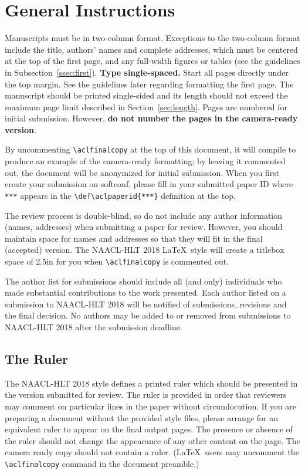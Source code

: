 \documentclass[11pt,a4paper]{article}
\def\aclpaperid{***} %
\begin{document}
\section{General Instructions}

Manuscripts must be in two-column format.  Exceptions to the
two-column format include the title, authors' names and complete
addresses, which must be centered at the top of the first page, and
any full-width figures or tables (see the guidelines in
Subsection~\ref{ssec:first}). {\bf Type single-spaced.}  Start all
pages directly under the top margin. See the guidelines later
regarding formatting the first page.  The manuscript should be
printed single-sided and its length
should not exceed the maximum page limit described in Section~\ref{sec:length}.
Pages are numbered for  initial submission. However, {\bf do not number the pages in the camera-ready version}.

By uncommenting {\small\verb|\aclfinalcopy|} at the top of this 
 document, it will compile to produce an example of the camera-ready formatting; by leaving it commented out, the document will be anonymized for initial submission.  When you first create your submission on softconf, please fill in your submitted paper ID where {\small\verb|***|} appears in the {\small\verb|\def\aclpaperid{***}|} definition at the top.

The review process is double-blind, so do not include any author information (names, addresses) when submitting a paper for review.  
However, you should maintain space for names and addresses so that they will fit in the final (accepted) version.  The NAACL-HLT 2018 \LaTeX\ style will create a titlebox space of 2.5in for you when {\small\verb|\aclfinalcopy|} is commented out.  

The author list for submissions should include all (and only) individuals who made substantial contributions to the work presented. Each author listed on a submission to NAACL-HLT 2018 will be notified of submissions, revisions and the final decision. No authors may be added to or removed from submissions to NAACL-HLT 2018 after the submission deadline.

\subsection{The Ruler}
The NAACL-HLT 2018 style defines a printed ruler which should be presented in the
version submitted for review.  The ruler is provided in order that
reviewers may comment on particular lines in the paper without
circumlocution.  If you are preparing a document without the provided
style files, please arrange for an equivalent ruler to
appear on the final output pages.  The presence or absence of the ruler
should not change the appearance of any other content on the page.  The
camera ready copy should not contain a ruler. (\LaTeX\ users may uncomment the {\small\verb|\aclfinalcopy|} command in the document preamble.)  
\end{document}

